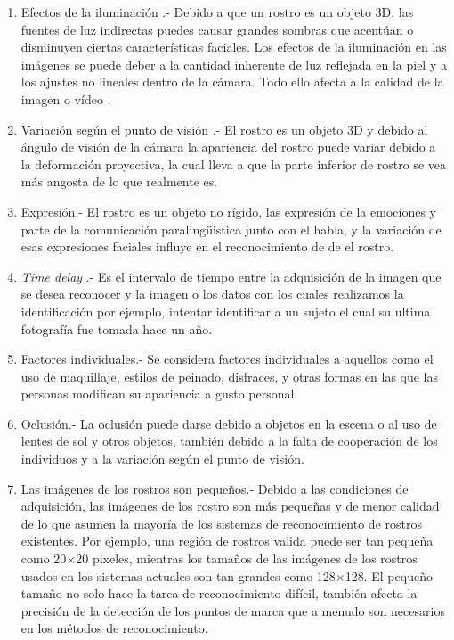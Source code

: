 \begin{enumerate}[1.]
\item Efectos de la iluminación \cite{kalocsai1998face} \cite{gross2001quo} \cite{johnston1992recognising} \cite{bruce1998human} \cite{hill1996effects}.- Debido a que un rostro es un objeto 3D, las fuentes de luz indirectas puedes causar grandes sombras que acentúan o disminuyen ciertas características faciales. Los efectos de la iluminación en las imágenes se puede deber a la cantidad inherente de luz reflejada en la piel y a los ajustes no lineales dentro de la cámara. Todo ello afecta a la calidad de la imagen o vídeo \cite{chiang1997local} \cite{aizawa1992scheme}.
\item Variación según el punto de visión  \cite{hill1997information} \cite{gross2001quo}.- El rostro es un objeto  3D y debido al ángulo de visión de la cámara la apariencia del rostro puede variar debido a la deformación proyectiva, la cual lleva a que la parte inferior de rostro se vea más angosta de lo que realmente es.
\item Expresión\cite{gross2001quo}.-  El rostro es un objeto no rígido, las expresión de la emociones y parte de la comunicación paralingüistica junto con el habla, y la variación de esas expresiones faciales influye en el reconocimiento de de el rostro.
\item \textit{Time delay} \cite{gross2001quo}.- Es el intervalo de tiempo entre la adquisición de la imagen que se desea reconocer y la imagen o los datos con los cuales realizamos la identificación por ejemplo, intentar identificar a un sujeto el cual su ultima fotografía fue tomada hace un año.
\item Factores individuales\cite{gross2001quo}.- Se considera factores individuales a aquellos como el uso de maquillaje, estilos de peinado, disfraces, y otras formas en las que las personas modifican su apariencia
a gusto personal.
\item Oclusión.- La oclusión puede darse debido a objetos en la escena o al uso de lentes de sol y otros objetos, también debido a la falta de cooperación de los individuos y a la variación según el punto de visión.
\item Las imágenes de los  rostros son pequeños.- Debido a las condiciones de adquisición, las imágenes de los rostro son más pequeñas y de menor calidad de lo que asumen la mayoría de los sistemas de reconocimiento de rostros existentes. Por ejemplo, una región de rostros valida puede ser tan pequeña como 20$\times$20 pixeles, mientras los tamaños de las imágenes de los rostros usados en los sistemas actuales son tan grandes como 128$\times$128. El pequeño tamaño no solo hace la tarea de reconocimiento difícil, también afecta la precisión de la detección de los puntos de marca que a menudo son necesarios en los métodos de reconocimiento.

\end{enumerate}
